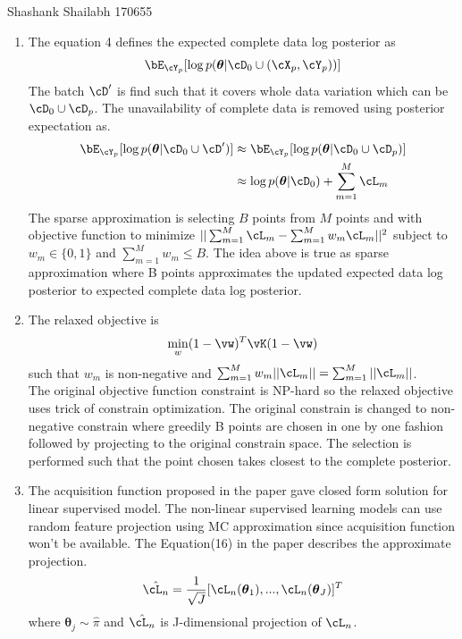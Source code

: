\documentclass[a4paper,11pt]{article}
\begin{document}
{Shashank Shailabh}   %
{170655}	%

\begin{pmisolution}
\begin{enumerate}
    \item The equation 4 defines the expected complete data log posterior as
\[\bE_{\cY_{p}}[\log p(\boldsymbol\theta|\cD_{0} \cup (\cX_{p},\cY_{p}))]\]
The batch \({\cD}'\) is find such that it covers whole data variation which can be \(\cD_{0} \cup \cD_{p}\). The unavailability of complete data is removed using posterior expectation as.
\begin{align*}
    \bE_{\cY_{p}}[\log p(\boldsymbol\theta|\cD_{0} \cup {\cD}')] &\approx \bE_{\cY_{p}}[\log p(\boldsymbol\theta|\cD_{0} \cup \cD_{p})]\\
    &\approx \log p(\boldsymbol\theta|\cD_{0}) + \sum_{m=1}^{M}\cL_{m}\\
\end{align*}
The sparse approximation is selecting \(B\) points from \(M\) points and with objective function  to minimize \(|| \sum_{m=1}^{M}\cL_{m} - \sum_{m=1}^{M}w_{m}\cL_{m}||^{2}\)  subject to \(w_{m}\in \{0,1\}\) and \(\sum_{m=1}^{M}w_{m} \leq B\). The idea above is true as sparse approximation where B points approximates the updated expected data log posterior to expected complete data log posterior.
\item The relaxed objective is
\[\min_{w} (1-\vw)^T\vK(1-\vw)\] such that \(w_{m}\) is non-negative and \(\sum_{m=1}^{M}w_{m}||\cL_{m}|| = \sum_{m=1}^{M}||\cL_{m}||\).\\
The original objective function constraint is NP-hard so the relaxed objective uses trick of constrain optimization. The original constrain is changed to non-negative constrain where greedily B points are chosen in one by one fashion followed by projecting to the original constrain space. The selection is performed such that the point chosen takes closest to the complete posterior.
\item The acquisition function proposed in the paper gave closed form solution for linear supervised model. The non-linear supervised learning models can use random feature projection using MC approximation since acquisition function won't be available. The Equation(16) in the paper describes the approximate projection.
\[ \hat{\cL_{n}} = \frac{1}{\sqrt{J}} [\cL_{n}(\boldsymbol\theta_1), ..., \cL_{n}(\boldsymbol\theta_{J})]^T\]
where \(\boldsymbol\theta_j \sim \hat{\pi}\) and \(\hat{\cL_{n}}\)  is J-dimensional projection of \(\cL_{n}\).
\end{enumerate}
\end{pmisolution}
\end{document}
